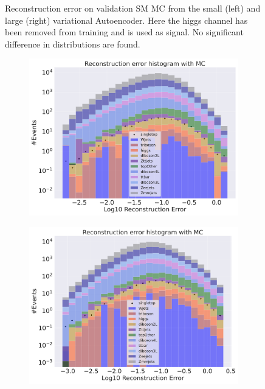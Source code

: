 \begin{figure}[h!]
\begin{subfigure}{.45\textwidth}
        \caption{ }
        \label{fig:vae_big_higgs}
    \end{subfigure}
    \hfill  
    \caption[VAE | Reconstruction error using Higgs channel as signal]{Reconstruction error on validation SM MC from the small (left) and large (right) variational Autoencoder. Here the higgs channel has been removed from training and 
    is used as signal. No significant difference in distributions are found. }
    \label{fig:vae_big_channel_1}
\end{figure}

\begin{figure}[h!]
    \centering
    \begin{subfigure}{.45\textwidth}
        \includegraphics[width=\textwidth]{Figures/VAE_testing/small/b_data_recon_big_rm3_feats_sig_singletop.pdf}
        \caption{ }
        \label{fig:vae_small_singletop}
    \end{subfigure}
    \hfill
    \begin{subfigure}{.45\textwidth}
        \includegraphics[width=\textwidth]{Figures/VAE_testing/big/b_data_recon_big_rm3_feats_sig_singletop.pdf}

\end{subfigure}
\end{figure}
